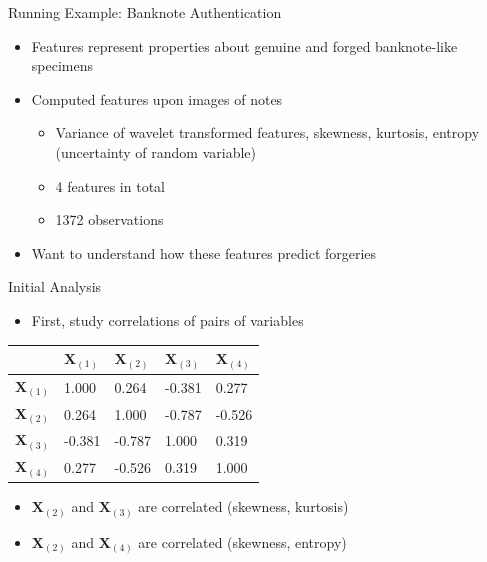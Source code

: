 \documentclass{beamer}
\begin{document}
\begin{frame}{Running Example: Banknote Authentication} 
\begin{itemize}
 \item Features represent properties about genuine and forged banknote-like specimens
 \item Computed features upon images of notes 
 \begin{itemize}
  \item Variance of wavelet transformed features, skewness, kurtosis, entropy (uncertainty of random variable)
  \item 4 features in total 
  \item 1372 observations 
 \end{itemize}
 \item Want to understand how these features predict forgeries 
\end{itemize}
\end{frame}

\begin{frame}{Initial Analysis} 
\begin{itemize} 
 \item First, study correlations of pairs of variables
\end{itemize}

\begin{table}
\centering
\resizebox{\linewidth}{!} {%
\begin{tabular}{l | l l l l}
 & $\textbf{X}_{(1)}$ & $\textbf{X}_{(2)}$ & $\textbf{X}_{(3)}$ & $\textbf{X}_{(4)}$ \\ 
 \hline
$\textbf{X}_{(1)}$ & 1.000 & 0.264 & -0.381 & 0.277\\
$\textbf{X}_{(2)}$ & 0.264 & 1.000 & -0.787 & -0.526\\
$\textbf{X}_{(3)}$ & -0.381 & -0.787 & 1.000 & 0.319\\
$\textbf{X}_{(4)}$ & 0.277 & -0.526 & 0.319 & 1.000\\
\end{tabular} }
\end{table} 
\begin{itemize} 
 \item $\textbf{X}_{(2)}$ and $\textbf{X}_{(3)}$ are correlated (skewness, kurtosis)
 \item $\textbf{X}_{(2)}$ and $\textbf{X}_{(4)}$ are correlated (skewness, entropy)
\end{itemize}
\end{frame}
\end{document}
